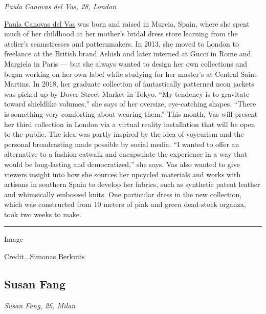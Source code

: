 \emph{Paula Canovas del Vas, 28, London}

\href{https://paulacanovasdelvas.com/}{Paula Canovas del Vas} was born
and raised in Murcia, Spain, where she spent much of her childhood at
her mother's bridal dress store learning from the atelier's seamstresses
and patternmakers. In 2013, she moved to London to freelance at the
British brand Ashish and later interned at Gucci in Rome and Margiela in
Paris --- but she always wanted to design her own collections and began
working on her own label while studying for her master's at Central
Saint Martins. In 2018, her graduate collection of fantastically
patterned neon jackets was picked up by Dover Street Market in Tokyo.
``My tendency is to gravitate toward shieldlike volumes,'' she says of
her oversize, eye-catching shapes. ``There is something very comforting
about wearing them.'' This month, Vas will present her third collection
in London via a virtual reality installation that will be open to the
public. The idea was partly inspired by the idea of voyeurism and the
personal broadcasting made possible by social media. ``I wanted to offer
an alternative to a fashion catwalk and encapsulate the experience in a
way that would be long-lasting and democratized,'' she says. Vas also
wanted to give viewers insight into how she sources her upcycled
materials and works with artisans in southern Spain to develop her
fabrics, such as synthetic patent leather and whimsically embossed
knits. One particular dress in the new collection, which was constructed
from 10 meters of pink and green dead-stock organza, took two weeks to
make.

\begin{center}\rule{0.5\linewidth}{\linethickness}\end{center}

Image

Credit...Simonas Berkutis

\hypertarget{susan-fang}{%
\subsection{Susan Fang}\label{susan-fang}}

\emph{Susan Fang, 26, Milan}

